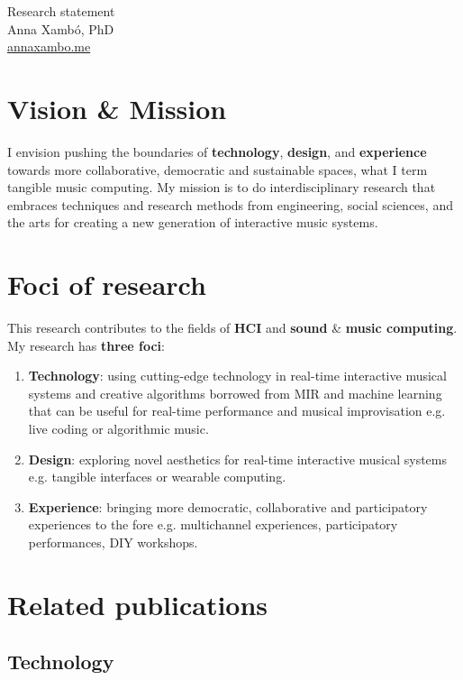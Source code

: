 \documentclass[10pt, a4paper]{article}
\begin{document}
{\LARGE Research statement}\\[0.2cm]
Anna Xambó, PhD\\
\href{http://annaxambo.me}{annaxambo.me}

\section*{Vision \& Mission}

I envision pushing the boundaries of \textbf{technology}, \textbf{design}, and \textbf{experience} towards more collaborative, democratic and sustainable spaces, what I term tangible music computing. My mission is to do interdisciplinary research that embraces techniques and research methods from engineering, social sciences, and the arts for creating a new generation of interactive music systems.

\section*{Foci of research}

This research contributes to the fields of \textbf{HCI} and \textbf{sound} \& \textbf{music computing}.\\ 

My research has \textbf{three foci}:

\begin{enumerate}
\item \textbf{Technology}: using cutting-edge technology in real-time interactive musical systems and creative algorithms borrowed from MIR and machine learning that can be useful for real-time performance and musical improvisation e.g. live coding or algorithmic music.
\item \textbf{Design}: exploring novel aesthetics for real-time interactive musical systems e.g. tangible interfaces or wearable computing. 
\item \textbf{Experience}: bringing more democratic, collaborative and participatory experiences to the fore e.g. multichannel experiences, participatory performances, DIY workshops. 
\end{enumerate}


\section*{Related publications}

\subsection*{Technology}
\end{document}

